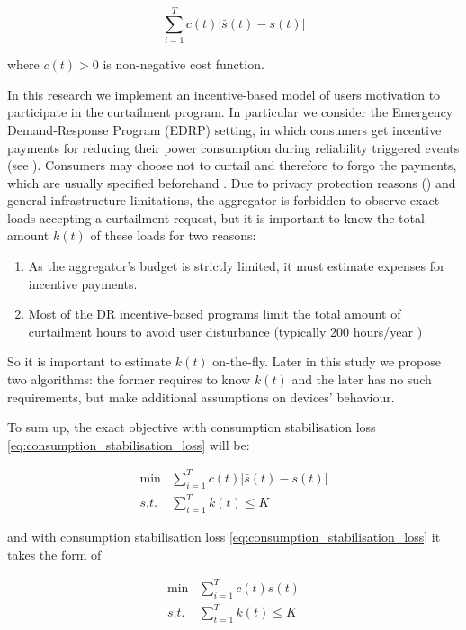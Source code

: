 \begin{equation}
\label{eq:consumption_stabilisation_loss}
\sum_{i=1}^T c(t) |{\bar s}(t) - s(t)|    
\end{equation}


where $c(t) > 0$  is non-negative cost function. 


In this research we implement an incentive-based model of users motivation to participate in the curtailment program. In particular we consider the Emergency Demand-Response Program (EDRP) setting, in which consumers get incentive payments for reducing their power consumption during reliability triggered events (see \cite{Aalami2010}). Consumers may choose not to curtail and therefore to forgo the payments, which are usually specified beforehand \cite{Vardakas2015}. Due to privacy protection reasons (\cite{Lisovich2010}) and general infrastructure limitations, the aggregator is forbidden to observe exact loads accepting a curtailment request, but it is important to know the total amount $k(t)$ of these loads for two reasons: 
    \begin{enumerate}
        \item As the aggregator's budget is strictly limited, it must estimate expenses for incentive payments. 
        \item Most of the DR incentive-based programs limit the total amount of curtailment hours to avoid user disturbance (typically 200 hours/year \cite{Aalami2010b})       
    \end{enumerate}
    So it is important to estimate $k(t)$ on-the-fly. Later in this study we propose two algorithms: the former requires to know $k(t)$ and the later has no such requirements, but make additional assumptions on devices' behaviour. 
    
To sum up, the exact objective with consumption stabilisation loss \ref{eq:consumption_stabilisation_loss} will be:

\begin{align}
    \label{eq:stabilisation_setup}
    \min & \sum_{i=1}^T c(t) |{\bar s}(t) - s(t)| \\
    s.t. & \sum_{t=1}^T k(t) \leq K 
\end{align}

and with consumption stabilisation loss \ref{eq:consumption_stabilisation_loss} it takes the form of

\begin{align}
    \label{eq:minimisation_setup}
    \min & \sum_{i=1}^T c(t)s(t) \\
    s.t. & \sum_{t=1}^T k(t) \leq K 
\end{align}